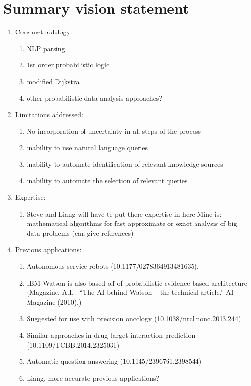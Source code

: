 \documentclass[11pt,notitlepage]{article}
\begin{document}
\section{Summary vision statement}
\begin{enumerate}
 \item Core methodology:
        \begin{enumerate}
        \item  NLP parsing
        \item  1st order probabilistic logic
        \item modified Dijkstra
        \item other probabilistic data analysis approaches?
  		\end{enumerate}
 \item Limitations addressed:
        \begin{enumerate}
        \item No incorporation of uncertainty in all steps of the process
        \item inability to use natural language queries
        \item inability to automate identification of relevant knowledge sources
        \item inability to automate the selection of relevant queries
        \end{enumerate}
 \item Expertise:
 		\begin{enumerate}
        \item Steve and Liang will have to put there expertise in here
        Mine is: mathematical algorithms for fast approximate or exact analysis of big data problems (can give references)
        \end{enumerate}
 \item Previous applications:
 		\begin{enumerate}
        \item Autonomous service robots (10.1177/0278364913481635),
        \item IBM Watson is also based off of probabilistic evidence-based architecture (Magazine, A.I.~ ``The AI behind Watson -- the technical article.'' AI Magazine (2010).)
        \item Suggested for use with precision oncology (10.1038/nrclinonc.2013.244)
        \item Similar approaches in drug-target interaction prediction (10.1109/TCBB.2014.2325031)
        \item Automatic question answering (10.1145/2396761.2398544)
        \item Liang, more accurate previous applications?
        \end{enumerate}
\end{enumerate}
\end{document}

